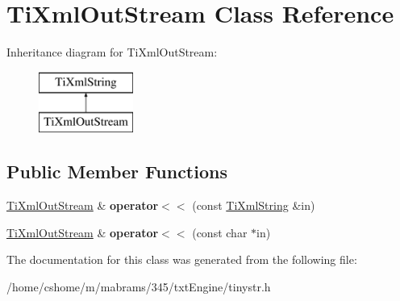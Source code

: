 \hypertarget{class_ti_xml_out_stream}{
\section{TiXmlOutStream Class Reference}
\label{class_ti_xml_out_stream}
}
Inheritance diagram for TiXmlOutStream:\begin{figure}[H]
\begin{center}
\leavevmode
\includegraphics[height=2.000000cm]{class_ti_xml_out_stream}
\end{center}
\end{figure}
\subsection*{Public Member Functions}
\begin{DoxyCompactItemize}
\item 
\hypertarget{class_ti_xml_out_stream_a3640dcb1c0903be3bc6966cdc9a79db6}{
\hyperlink{class_ti_xml_out_stream}{TiXmlOutStream} \& {\bfseries operator$<$$<$} (const \hyperlink{class_ti_xml_string}{TiXmlString} \&in)}
\label{class_ti_xml_out_stream_a3640dcb1c0903be3bc6966cdc9a79db6}

\item 
\hypertarget{class_ti_xml_out_stream_af2117e5a8cbfcb69544804ad2859bfb6}{
\hyperlink{class_ti_xml_out_stream}{TiXmlOutStream} \& {\bfseries operator$<$$<$} (const char $\ast$in)}
\label{class_ti_xml_out_stream_af2117e5a8cbfcb69544804ad2859bfb6}

\end{DoxyCompactItemize}


The documentation for this class was generated from the following file:\begin{DoxyCompactItemize}
\item 
/home/cshome/m/mabrams/345/txtEngine/tinystr.h\end{DoxyCompactItemize}
